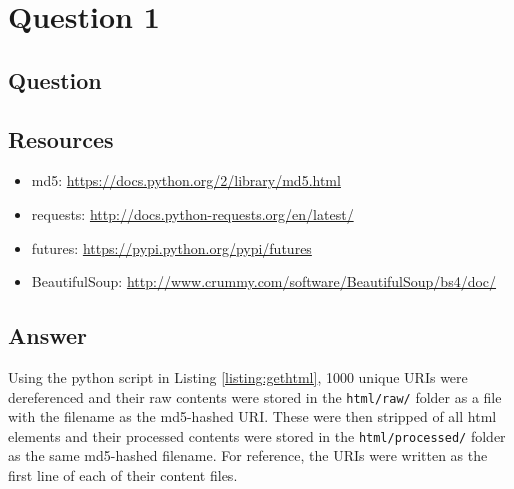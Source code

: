 \section{Question 1}

\subsection{Question}


\subsection{Resources}
\begin{itemize}
\item md5: \url{https://docs.python.org/2/library/md5.html}
\item requests: \url{http://docs.python-requests.org/en/latest/}
\item futures: \url{https://pypi.python.org/pypi/futures}
\item BeautifulSoup: \url{http://www.crummy.com/software/BeautifulSoup/bs4/doc/}
\end{itemize}

\subsection{Answer}
Using the python script in Listing \ref{listing:gethtml}, 1000 unique URIs were dereferenced and
their raw contents were stored in the {\tt html/raw/} folder as a file with the filename as the
md5-hashed URI. These were then stripped of all html elements and their processed contents were 
stored in the {\tt html/processed/} folder as the same md5-hashed filename. For reference, the URIs were written as the first line of each of their content files.

